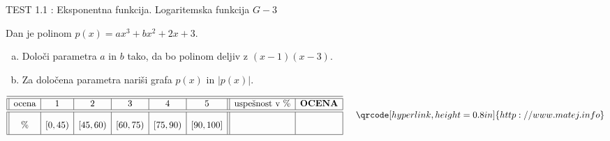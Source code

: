 \documentclass[a4paper,12pt]{letter}
\renewcommand{\headrulewidth}{3pt}
\renewcommand{\headrulewidth}{0.3pt}
\newcounter{tocke}
\begin{document}
\pagestyle{fancy}
\renewcommand\headrulewidth{0pt}
\lhead{}\chead{}\rhead{}
\rfoot{\vspace*{-2\baselineskip}}


\renewcommand{\vec}{\overrightarrow}


\everymath{\displaystyle}

\begin{minipage}{20cm}
\begin{bclogo}[couleur=brown!40,
  arrondi=0,ombre=true, couleurOmbre=gray!50,
logo =\bcplume,
  noborder=true]
{\textrm{{\Large{TEST 1.1} \Huge{}:
%
%
\large{Eksponentna funkcija. Logaritemska funkcija} \hfill $G-3$}}}
\end{bclogo}
\end{minipage}
\begin{minipage}{20cm}
\end{minipage}
\def\t3{10}
\begin{naloga}[\hfill \quad $\t3$ točk] \addtocounter{tocke}{\t3}
Dan je polinom $p(x)=ax^3+bx^2+2x+3$.
        \begin{enumerate}[a)]
            \item Določi parametra $a$ in $b$ tako, da bo polinom deljiv z $(x-1)(x-3)$.
                \item Za določena parametra nariši grafa $p(x)$ in $|p(x)|.$
                \end{enumerate}
\end{naloga}
\vfill
{}
\begin{kriterij*}
 $$
 \begin{array}{||c|c|c|c|c|c||
>{}c|c|}
 \hline\hline
 \textup{ocena}& 1&2&3&4&5&\textrm{uspe\v{s}nost v } \%& \textrm{\bf OCENA}\\
  \hline\hline
 \% & [0,45) &[45,60)&[60,75
 ) &[75,90)    &    [90,100]& \mbox{\phantom{ \huge{$\frac{5}{445}$
 15}}
 } 
 & \\
 \hline
 \end{array} \hspace*{0.5cm}\vspace*{-0.3cm} \qrcode[hyperlink,height=0.8in]{http://www.matej.info}
$$
\vspace*{0.1cm}
\end{kriterij*}
\end{document}
